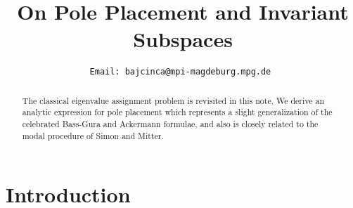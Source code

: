 \documentclass[conference]{IEEEtran}
\begin{document}
\title{On Pole Placement and Invariant Subspaces}




\author{
\tt\small Email:  bajcinca@mpi-magdeburg.mpg.de\vspace{-12pt}
}




\maketitle



\begin{abstract}
The classical eigenvalue assignment problem is revisited in this
note. We derive an analytic expression for pole placement
which represents a slight generalization of the celebrated Bass-Gura and Ackermann formulae, and also is closely related to the modal procedure of Simon and Mitter.
\end{abstract}
\IEEEpeerreviewmaketitle

\vspace{-5pt}
\section{Introduction}
\label{Introduction}
\vspace{-2pt}
\end{document}
